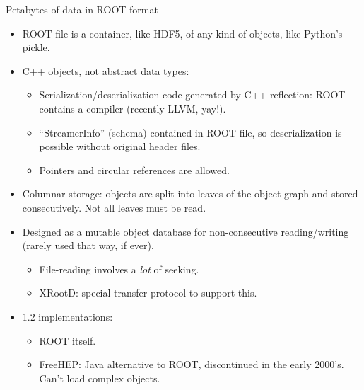 \documentclass{beamer}
\begin{document}
\begin{frame}{Petabytes of data in ROOT format}
\vspace{0.25 cm}
\begin{itemize}\setlength{\itemsep}{0.1 cm}
\item ROOT file is a container, like HDF5, of any kind of objects, like Python's pickle.
\item C++ objects, not abstract data types:
\begin{itemize}
\item Serialization/deserialization code generated by C++ reflection: ROOT contains a compiler (recently LLVM, yay!).
\item ``StreamerInfo'' (schema) contained in ROOT file, so deserialization is possible without original header files.
\item Pointers and circular references are allowed.
\end{itemize}
\item Columnar storage: objects are split into leaves of the object graph and stored consecutively. Not all leaves must be read.
\item Designed as a mutable object database for non-consecutive reading/writing (rarely used that way, if ever).
\begin{itemize}
\item File-reading involves a {\it lot} of seeking.
\item XRootD: special transfer protocol to support this.
\end{itemize}
\item 1.2 implementations:
\begin{itemize}
\item ROOT itself.
\item FreeHEP: Java alternative to ROOT, discontinued in the early 2000's. Can't load complex objects.
\end{itemize}
\end{itemize}
\end{frame}
\end{document}
